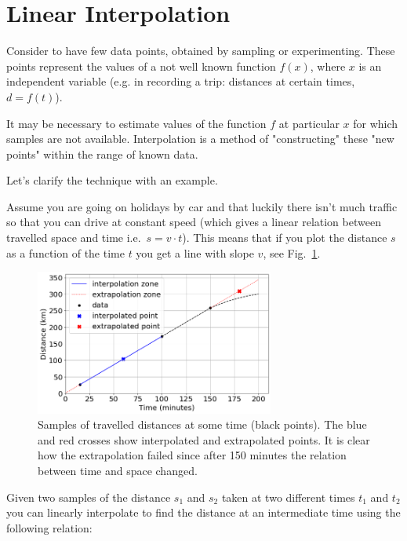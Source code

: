 \section{Linear Interpolation}
\label{linear-interpolation}

Consider to have few data points, obtained by sampling or experimenting. These points represent the values of a not well known function $f(x)$, where $x$ is an independent variable (e.g. in recording a trip: distances at certain times, $d = f(t)$).

It may be necessary to estimate values of the function $f$ at particular $x$ for which samples are not available. Interpolation is a method of "constructing" these "new points" within the range of known data.

Let's clarify the technique with an example.

Assume you are going on holidays by car and that luckily there isn't much traffic so that you can drive at constant speed (which gives a linear relation between travelled space and time i.e.~$s = v \cdot t$). This means that if you plot the distance $s$ as a function of the time $t$ you get a line with slope $v$, see Fig.~\ref{fig:samples_for_interpolation}.

\begin{figure}[htbp]
  \centering
  \includegraphics[width=0.7\textwidth]{figures/interp_example1.png}
  \caption{Samples of travelled distances at some time (black points). The blue and red crosses show interpolated and extrapolated points. It is clear how the extrapolation failed since after 150 minutes the relation between time and space changed.}
  \label{fig:samples_for_interpolation}
\end{figure}

Given two samples of the distance $s_1$ and $s_2$ taken at two different times $t_1$ and $t_2$ you can linearly interpolate to find the distance at an intermediate time using the following relation:

